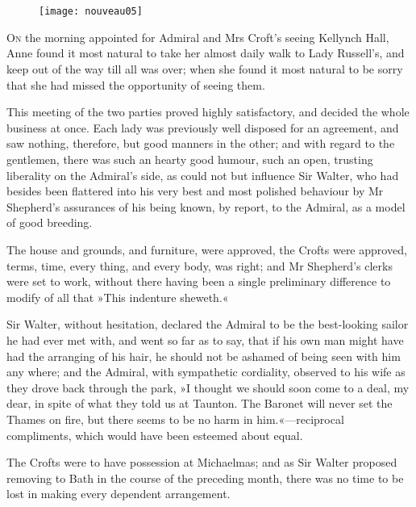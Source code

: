\chapter[Chapter \thechapter]{}

\begin{figure}[t!]
\centering
\texttt{[image: nouveau05]}
\end{figure}

\lettrine[lines=4,lraise=0.3]{O}{n} the morning appointed for Admiral and Mrs Croft's seeing Kellynch Hall, Anne found it most natural to take her almost daily walk to Lady Russell's, and keep out of the way till all was over; when she found it most natural to be sorry that she had missed the opportunity of seeing them.

This meeting of the two parties proved highly satisfactory, and decided the whole business at once. Each lady was previously well disposed for an agreement, and saw nothing, therefore, but good manners in the other; and with regard to the gentlemen, there was such an hearty good humour, such an open, trusting liberality on the Admiral's side, as could not but influence Sir Walter, who had besides been flattered into his very best and most polished behaviour by Mr Shepherd's assurances of his being known, by report, to the Admiral, as a model of good breeding.

The house and grounds, and furniture, were approved, the Crofts were approved, terms, time, every thing, and every body, was right; and Mr Shepherd's clerks were set to work, without there having been a single preliminary difference to modify of all that »This indenture sheweth.«

Sir Walter, without hesitation, declared the Admiral to be the best-looking sailor he had ever met with, and went so far as to say, that if his own man might have had the arranging of his hair, he should not be ashamed of being seen with him any where; and the Admiral, with sympathetic cordiality, observed to his wife as they drove back through the park, »I thought we should soon come to a deal, my dear, in spite of what they told us at Taunton. The Baronet will never set the Thames on fire, but there seems to be no harm in him.«—reciprocal compliments, which would have been esteemed about equal.

The Crofts were to have possession at Michaelmas; and as Sir Walter proposed removing to Bath in the course of the preceding month, there was no time to be lost in making every dependent arrangement.

